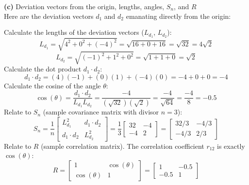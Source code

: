 \documentclass{article}
\begin{document}
\vspace{1em}
\noindent \textbf{(c)} Deviation vectors from the origin, lengths, angles, $S_n$, and $R$ \\
Here are the deviation vectors $d_1$ and $d_2$ emanating directly from the origin:
\begin{center}
\end{center}

Calculate the lengths of the deviation vectors ($L_{d_1}$, $L_{d_2}$):
\[
L_{d_1} = \sqrt{4^2 + 0^2 + (-4)^2} = \sqrt{16 + 0 + 16} = \sqrt{32} = 4\sqrt{2}
\]
\[
L_{d_2} = \sqrt{(-1)^2 + 1^2 + 0^2} = \sqrt{1 + 1 + 0} = \sqrt{2}
\]
Calculate the dot product $d_1 \cdot d_2$:
\[
d_1 \cdot d_2 = (4)(-1) + (0)(1) + (-4)(0) = -4 + 0 + 0 = -4
\]
Calculate the cosine of the angle $\theta$:
\[
\cos(\theta) = \frac{d_1 \cdot d_2}{L_{d_1} L_{d_2}} = \frac{-4}{(\sqrt{32})(\sqrt{2})} = \frac{-4}{\sqrt{64}} = \frac{-4}{8} = -0.5
\]
Relate to $S_n$ (sample covariance matrix with divisor $n=3$):
\[
S_n = \frac{1}{n} \begin{bmatrix} L_{d_1}^2 & d_1 \cdot d_2 \\ d_1 \cdot d_2 & L_{d_2}^2 \end{bmatrix} = \frac{1}{3} \begin{bmatrix} 32 & -4 \\ -4 & 2 \end{bmatrix} = \begin{bmatrix} 32/3 & -4/3 \\ -4/3 & 2/3 \end{bmatrix}
\]
Relate to $R$ (sample correlation matrix). The correlation coefficient $r_{12}$ is exactly $\cos(\theta)$:
\[
R = \begin{bmatrix} 1 & \cos(\theta) \\ \cos(\theta) & 1 \end{bmatrix} = \begin{bmatrix} 1 & -0.5 \\ -0.5 & 1 \end{bmatrix}
\]
\end{document}
